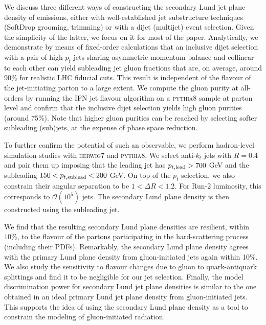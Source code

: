\documentclass[a4paper,11pt]{article}
\newcommand{\py}{{\textsc{pythia}}8\xspace}
\newcommand{\hw}{{\textsc{herwig}}7\xspace}
\begin{document}
We discuss three different ways of constructing the secondary Lund jet plane density of emissions, either with well-established jet substructure techniques (SoftDrop grooming, trimming) or with a dijet (multijet) event selection. Given the simplicity of the latter, we focus on it for most of the paper. Analytically, we demonstrate by means of fixed-order calculations that an inclusive dijet selection with a pair of high-$p_t$ jets sharing asymmetric momentum balance and collinear to each other can yield subleading jet gluon fractions that are, on average, around 90\% for realistic LHC fiducial cuts. This result is independent of the flavour of the jet-initiating parton to a large extent. We compute the gluon purity at all-orders by running the IFN jet flavour algorithm on a \py sample at parton level and confirm that the inclusive dijet selection yields high gluon purities (around 75\%). Note that higher gluon purities can be reached by selecting softer subleading (sub)jets, at the expense of phase space reduction. 

To further confirm the potential of such an observable, we perform hadron-level simulation studies with \hw and \py. We select anti-$k_t$ jets with $R=0.4$ and pair them up imposing that the leading jet has $p_{t,{\rm lead}}>700$ GeV and the subleading $150<p_{t,{\rm sublead}}<200$ GeV. On top of the $p_t$-selection, we also constrain their angular separation to be $1<\Delta R < 1.2$. For Run-2 luminosity, this corresponds to $\mathcal{O}(10^5)$ jets. The secondary Lund plane density is then constructed using the subleading jet. 

We find that the resulting secondary Lund plane densities are resilient, within $10\%$, to the flavour of the partons participating in the hard-scattering process (including their PDFs). Remarkably, the secondary Lund plane density agrees with the primary Lund plane density from gluon-initiated jets again within 10\%. We also study the sensitivity to flavour changes due to gluon to quark-antiquark splittings and find it to be negligible for our jet selection. Finally, the model discrimination power for secondary Lund jet plane densities is similar to the one obtained in an ideal primary Lund jet plane density from gluon-initiated jets. This supports the idea of using the secondary Lund plane density as a tool to constrain the modeling of gluon-initiated radiation.
\end{document}
